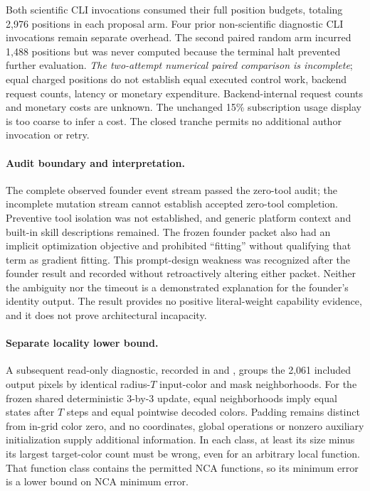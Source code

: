 \documentclass[11pt]{article}
\begin{document}
Both scientific CLI invocations consumed their full position budgets, totaling
2{,}976 positions in each proposal arm. Four prior non-scientific diagnostic CLI
invocations remain separate overhead. The second paired random arm incurred
1{,}488 positions but was never computed because the terminal halt prevented
further evaluation. \emph{The two-attempt numerical paired comparison is
incomplete}; equal charged positions do not establish equal executed control
work, backend request counts, latency or monetary expenditure. Backend-internal
request counts and monetary costs are unknown. The unchanged 15\% subscription
usage display is too coarse to infer a cost. The closed tranche permits no
additional author invocation or retry.

\paragraph{Audit boundary and interpretation.}
The complete observed founder event stream passed the zero-tool audit; the
incomplete mutation stream cannot establish accepted zero-tool completion.
Preventive tool isolation was not established, and generic platform context
and built-in skill descriptions remained. The frozen founder packet also had
an implicit optimization objective and prohibited ``fitting'' without qualifying
that term as gradient fitting. This prompt-design weakness was recognized after
the founder result and recorded without retroactively altering either packet.
Neither the ambiguity nor the timeout is a demonstrated explanation for the
founder's identity output. The result provides no positive literal-weight
capability evidence, and it does not prove architectural incapacity.

\paragraph{Separate locality lower bound.}
A subsequent read-only diagnostic, recorded in
 and
, groups the 2{,}061 included
output pixels by identical radius-$T$ input-color and mask neighborhoods.
For the frozen shared deterministic 3-by-3 update, equal neighborhoods imply
equal states after $T$ steps and equal pointwise decoded colors. Padding remains
distinct from in-grid color zero, and no coordinates, global operations or
nonzero auxiliary initialization supply additional information. In each class,
at least its size minus its largest target-color count must be wrong, even for
an arbitrary local function. That function class contains the permitted NCA
functions, so its minimum error is a lower bound on NCA minimum error.
\end{document}
